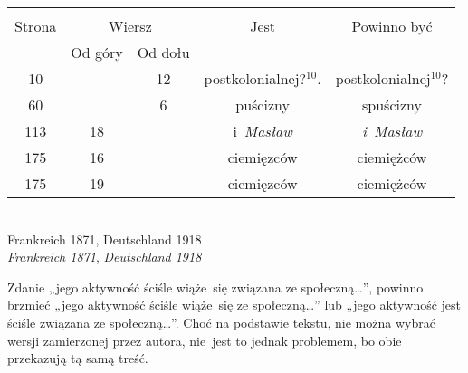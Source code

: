 \documentclass[a4paper,11pt]{article}
\begin{document}
\begin{center}

  \begin{tabular}{|c|c|c|c|c|}
    \hline
    & \multicolumn{2}{c|}{} & & \\
    Strona & \multicolumn{2}{c|}{Wiersz} & Jest
                              & Powinno być \\ \cline{2-3}
    & Od góry & Od dołu & & \\
    \hline
    10  & & 12 & postkolonialnej?$^{ 10 }$. & postkolonialnej$^{ 10 }$? \\
    60  & &  6 & puścizny & spuścizny \\
    113 & 18 & & i~\textit{Masław} & \textit{i~Masław} \\
    175 & 16 & & ciemięzców & ciemiężców \\
    175 & 19 & & ciemięzców & ciemiężców \\
    \hline
  \end{tabular}

\end{center}


\noindent
{} \\
\Jest  Frankreich 1871, Deutschland 1918 \\
\Powin \textit{Frankreich 1871}, \textit{Deutschland 1918} \\


\vspace{\spaceTwo}














\start {} Zdanie „jego aktywność ściśle wiąże~się
związana ze społeczną\ldots”, powinno brzmieć „jego aktywność ściśle
wiąże~się ze społeczną\ldots” lub „jego aktywność jest ściśle
związana ze społeczną\ldots”. Choć na podstawie tekstu, nie można
wybrać wersji zamierzonej przez autora, nie~jest to jednak problemem,
bo obie przekazują tą samą treść.
\end{document}
